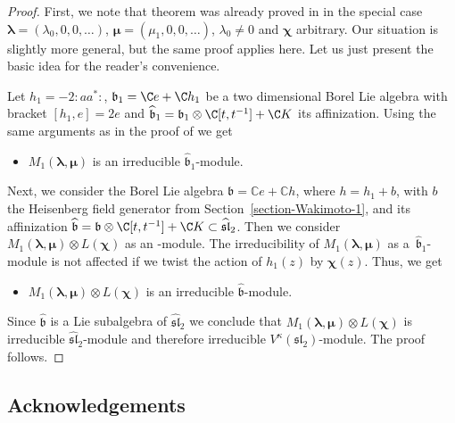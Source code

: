 \documentclass[pdftex]{sigma}
\numberwithin{equation}{section}
\theoremstyle{definition}
\newcommand{\1}{\textbf{1}}
\begin{document}
\begin{proof} First, we note that theorem was already proved in \cite[Theorem 10.4]{ALZ-16} in the special case $\bm{\lambda} = (\lambda_0, 0, 0, \dots )$, $\bm{\mu} = (\mu_1, 0, 0, \dots )$, $\lambda_0 \ne 0$ and $\bm{\chi}$ arbitrary. Our situation is slightly more general, but the same proof applies here. Let us just present the basic idea for the reader’s convenience.

 Let $ h_1 =-2 {:} a a^*{:}$, ${\mathfrak b}_1 = {\C} e + {\C} h_1$ be a two dimensional Borel Lie algebra with bracket
$[h_1, e] = 2 e$ and
$\widehat {{\mathfrak b}} _1 = {\mathfrak b}_1 \otimes {\C}[t, t^{-1}] + {\C} K$ its affinization. Using the same arguments as in the proof of \cite[Proposition~10.2]{ALZ-16} we get
\begin{itemize}\itemsep=0pt
\item $M_1(\bm{\lambda}, \bm{\mu})$ is an irreducible $\widehat {{\mathfrak b}} _1$-module.
\end{itemize}

Next, we consider the Borel Lie algebra $\mathfrak b=\mathbb C e+\mathbb C h$, where
$h=h_1+b$,
with $b$ the Heisenberg field generator from Section~\ref{section-Wakimoto-1}, and its affinization $\widehat{ \mathfrak b} = {\mathfrak b} \otimes {\C} [t,t^{-1}] + {\C} K \subset \widehat {\mathfrak{sl}}_2$. Then we consider $M_1 (\bm{\lambda}, \bm{\mu}) \otimes L (\bm{\chi})$ as an -module. The irreducibility of $M_1(\bm{\lambda}, \bm{\mu})$ as a~$\widehat {{\mathfrak b}} _1$\nobreakdash-mod\-ule is not affected if we twist the action of $h_1(z)$ by $\bm{\chi}(z)$.
Thus, we get
\begin{itemize}\itemsep=0pt
\item $ M_1(\bm{\lambda}, \bm{\mu}) \otimes L(\bm{\chi})$ is an irreducible $\widehat{ \mathfrak b}$-module.
\end{itemize}
 Since $\widehat{ \mathfrak b} $ is a Lie subalgebra of $ \widehat {\mathfrak{sl}}_2$ we conclude that $M_1(\bm{\lambda}, \bm{\mu}) \otimes L(\bm{\chi})$ is irreducible $ \widehat {\mathfrak{sl}}_2$-module and therefore irreducible $V^{\kappa} (\mathfrak{sl}_2)$-module. The proof follows.
 \end{proof}

\subsection*{Acknowledgements}
\end{document}
